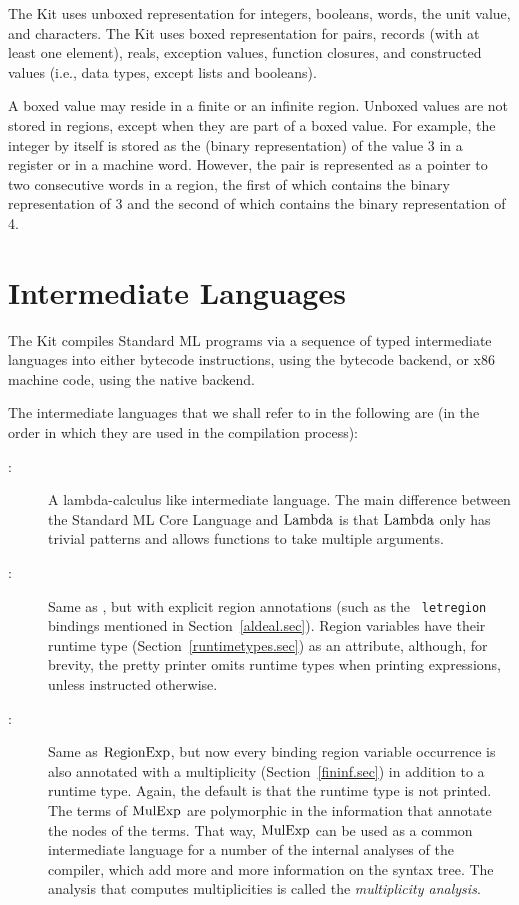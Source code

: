 \documentclass[12pt]{book}
\begin{document}
The Kit uses unboxed representation for integers, booleans, words, the
unit value, and characters.  The Kit uses boxed representation for
pairs, records (with at least one element), reals, exception values,
function closures, and constructed values (i.e., data types, except
lists and booleans).

A boxed value may reside in a finite or an infinite region.  Unboxed
values are not stored in regions, except when they are part of a boxed
value. For example, the integer  by itself is stored as the
(binary representation) of the value 3 in a register or in a machine
word. However, the pair  is represented as a pointer to
two consecutive words in a region, the first of which contains the
binary representation of 3 and the second of which contains the binary
representation of 4.

\section{Intermediate Languages}
The Kit compiles Standard ML programs via a sequence of typed
intermediate languages into either bytecode instructions, using the
bytecode backend, or x86 machine code, using the native backend.

The intermediate languages that we shall refer to in the following are
(in the order in which they are used in the compilation process):
\begin{description}
\item[\Lam:] 
  A lambda-calculus like intermediate language. The main difference
  between the Standard ML Core Language and $\hbox{\rm Lambda}$ is that $\hbox{\rm Lambda}$ only
  has trivial patterns and allows functions to take 
%
%
%
  multiple arguments.
\item[\RegExp:] 
  Same as \Lam, but with explicit region annotations (such as the {\tt
    letregion} bindings mentioned in Section~\ref{aldeal.sec}). Region
  variables have their runtime type (Section~\ref{runtimetypes.sec})
  as an attribute, although, for brevity, the pretty printer omits
  runtime types when printing expressions, unless instructed
  otherwise.
\item[\MulExp:] 
  Same as $\hbox{\rm RegionExp}$, but now every binding region variable occurrence
  is also annotated with a multiplicity (Section~\ref{fininf.sec}) in
  addition to a runtime type.  Again, the default is that the runtime
  type is not printed.  The terms of $\hbox{\rm MulExp}$ are polymorphic in the
  information that annotate the nodes of the terms. That way,
  $\hbox{\rm MulExp}$ can be used as a common intermediate language for a number
  of the internal analyses of the compiler, which add more and more
  information on the syntax tree.  The analysis that computes
  multiplicities is called the
  {\em multiplicity analysis}.
\end{description}
\end{document}
